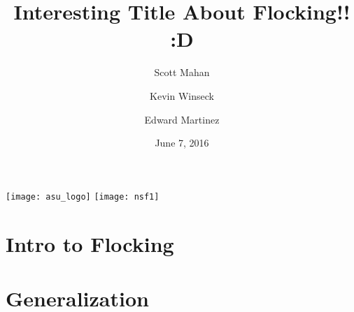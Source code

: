 \documentclass{beamer}
\title[]{Interesting Title About Flocking!! :D}
\author[]{Scott Mahan \and Kevin Winseck \and Edward Martinez}
\institute{Dr. Sebastien Motsch \\ Arizona State University}
\date{June 7, 2016}
\begin{document}
\begin{frame}
  \titlepage
  \texttt{[image: asu\_logo]}
  \hfill
  \texttt{[image: nsf1]}
\end{frame}
\section{Intro to Flocking}
\begin {frame}

\end{frame}

\section{Generalization}
\begin {frame}

\end{frame}
\end{document}
